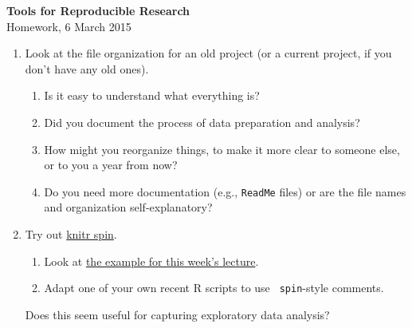 \documentclass[12pt]{article}
\newcommand{\ttsm}{\tt \small}
\begin{document}
\thispagestyle{empty}

\textbf{Tools for Reproducible Research} \\
Homework, 6 March 2015

\bigskip

\begin{enumerate}

\item Look at the file organization for an old project (or a current
  project, if you don't have any old ones).

  \begin{enumerate}
  \item Is it easy to understand what everything is?
  \item Did you document the process of data preparation and
    analysis?
  \item How might you reorganize things, to make it more clear to
    someone else, or to you a year from now?
  \item Do you need more documentation (e.g., {\ttsm ReadMe} files) or
    are the file names and organization self-explanatory?
  \end{enumerate}

\item Try out \href{http://yihui.name/knitr/demo/stitch/}{knitr spin}.

  \begin{enumerate}
    \item Look at
      \href{https://github.com/kbroman/Tools4RR/tree/master/06_Organization_EDA/Examples}{the
        example for this week's lecture}.
    \item Adapt one of your own recent R scripts to use {\ttsm
      spin}-style comments.
  \end{enumerate}

  Does this seem useful for capturing exploratory data analysis?
\end{enumerate}
\end{document}
